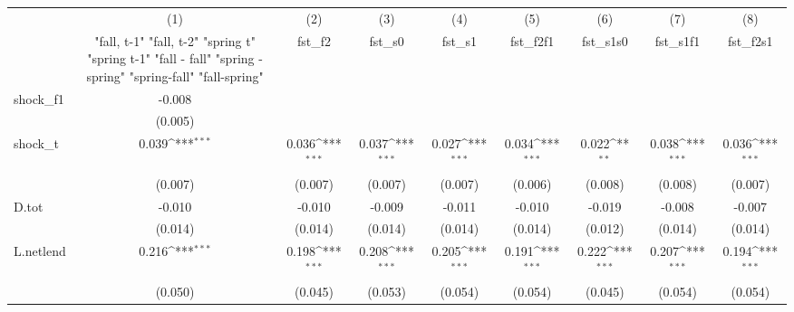 {
\def\sym#1{\ifmmode^{#1}\else\(^{#1}\)\fi}
\begin{tabular}{l*{8}{c}}
\toprule
            &\multicolumn{1}{c}{(1)}&\multicolumn{1}{c}{(2)}&\multicolumn{1}{c}{(3)}&\multicolumn{1}{c}{(4)}&\multicolumn{1}{c}{(5)}&\multicolumn{1}{c}{(6)}&\multicolumn{1}{c}{(7)}&\multicolumn{1}{c}{(8)}\\
            &\multicolumn{1}{c}{  "fall, t-1" "fall, t-2" "spring t" "spring t-1"  "fall - fall" "spring - spring" "spring-fall" "fall-spring" }&\multicolumn{1}{c}{fst\_f2}&\multicolumn{1}{c}{fst\_s0}&\multicolumn{1}{c}{fst\_s1}&\multicolumn{1}{c}{fst\_f2f1}&\multicolumn{1}{c}{fst\_s1s0}&\multicolumn{1}{c}{fst\_s1f1}&\multicolumn{1}{c}{fst\_f2s1}\\
\midrule
shock\_f1    &      -0.008         &                     &                     &                     &                     &                     &                     &                     \\
            &     (0.005)         &                     &                     &                     &                     &                     &                     &                     \\
\addlinespace
shock\_t     &       0.039\sym{***}&       0.036\sym{***}&       0.037\sym{***}&       0.027\sym{***}&       0.034\sym{***}&       0.022\sym{**} &       0.038\sym{***}&       0.036\sym{***}\\
            &     (0.007)         &     (0.007)         &     (0.007)         &     (0.007)         &     (0.006)         &     (0.008)         &     (0.008)         &     (0.007)         \\
\addlinespace
D.tot       &      -0.010         &      -0.010         &      -0.009         &      -0.011         &      -0.010         &      -0.019         &      -0.008         &      -0.007         \\
            &     (0.014)         &     (0.014)         &     (0.014)         &     (0.014)         &     (0.014)         &     (0.012)         &     (0.014)         &     (0.014)         \\
\addlinespace
L.netlend   &       0.216\sym{***}&       0.198\sym{***}&       0.208\sym{***}&       0.205\sym{***}&       0.191\sym{***}&       0.222\sym{***}&       0.207\sym{***}&       0.194\sym{***}\\
            &     (0.050)         &     (0.045)         &     (0.053)         &     (0.054)         &     (0.054)         &     (0.045)         &     (0.054)         &     (0.054)         \\

\end{tabular}}

